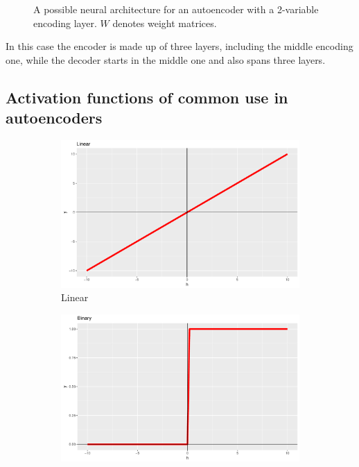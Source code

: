 \documentclass[preprint,5p,compress]{elsarticle}
\begin{document}
\begin{figure}[ht!]
{  }
  \caption[Sample autoencoder]{A possible neural architecture for an autoencoder with a 2-variable encoding layer. $W$ denotes weight matrices.}
  \label{fig:ae-example}
\end{figure}

In this case the encoder is made up of three layers, including the middle encoding one, while the decoder starts in the middle one and also spans three layers. 

\subsection{Activation functions of common use in autoencoders}
\begin{figure}[htp!]
	\centering
	\begin{subfigure}[t]{0.3\textwidth}
		\centering
		\includegraphics[width=\linewidth]{Linear.pdf} 
		\caption{Linear} \label{Fig.Linear}
	\end{subfigure}
	\begin{subfigure}[t]{0.3\textwidth}
		\centering
		\includegraphics[width=\linewidth]{Binary.pdf} 

\end{subfigure}
\end{figure}
\end{document}
